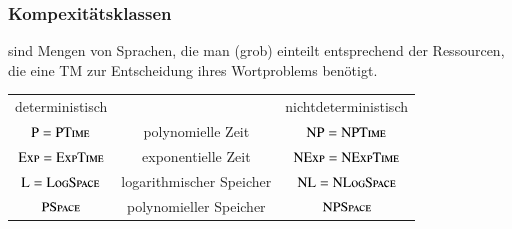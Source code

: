 \documentclass[onlymath]{beamer}
\begin{document}
\maketitle


\begin{frame}\frametitle{Kompexitätsklassen}

 sind Mengen von Sprachen, die man (grob) einteilt entsprechend der Ressourcen,
die eine TM zur Entscheidung ihres Wortproblems benötigt.\bigskip

\begin{tabular}{ccc}
\alert{deterministisch} & & \alert{nichtdeterministisch} \\[1ex]
${\textsc{P}}={\textsc{PTime}}$ & \alert{polynomielle Zeit} & ${\textsc{NP}}={\textsc{NPTime}}$\\
${\textsc{Exp}}={\textsc{ExpTime}}$ & \alert{exponentielle Zeit} & ${\textsc{NExp}}={\textsc{NExpTime}}$\\[1ex]
${\textsc{L}}={\textsc{LogSpace}}$ & \alert{logarithmischer Speicher} & ${\textsc{NL}}={\textsc{NLogSpace}}$\\
${\textsc{PSpace}}$ & \alert{polynomieller Speicher} & ${\textsc{NPSpace}}$\\
\end{tabular}

\end{frame}
\end{document}
